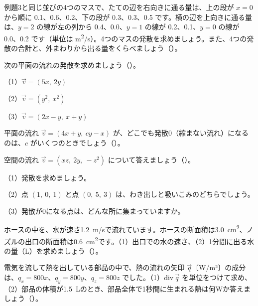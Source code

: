 \bkproblem 例題3と同じ並びの4つのマスで、たての辺を右向きに通る量は、上の段が $x=0$ から順に 0.1、0.6、0.2、下の段が 0.3、0.3、0.5 です。横の辺を上向きに通る量は、$y=2$ の線が左の列から 0.4、0.0、$y=1$ の線が 0.2、0.1、$y=0$ の線が 0.0、0.2 です（単位は \unit{m^2/s}）。4つのマスの発散を求めましょう。また、4つの発散の合計と、外まわりから出る量をくらべましょう\mbox{（）}。

\bkproblem 次の平面の流れの発散を求めましょう\mbox{（）}。\par
（1）$\vec v=(5x,\ 2y)$\par
（2）$\vec v=(y^2,\ x^2)$\par
（3）$\vec v=(2x-y,\ x+y)$

\bkproblem 平面の流れ $\vec v=(4x+y,\ cy-x)$ が、どこでも発散0（縮まない流れ）になるのは、$c$ がいくつのときでしょう\mbox{（）}。

\bkproblem 空間の流れ $\vec v=(xz,\ 2y,\ -z^2)$ について答えましょう\mbox{（）}。\par
（1）発散を求めましょう。\par
（2）点 $(1,\ 0,\ 1)$ と点 $(0,\ 5,\ 3)$ は、わき出しと吸いこみのどちらでしょう。\par
（3）発散が0になる点は、どんな所に集まっていますか。

\bkproblem ホースの中を、水が速さ\qty{1.2}{m/s}で流れています。ホースの断面積は\qty{3.0}{cm^2}、ノズルの出口の断面積は\qty{0.6}{cm^2}です。（1）出口での水の速さ、（2）1分間に出る水の量（L）を求めましょう\mbox{（）}。

\bkproblem 電気を流して熱を出している部品の中で、熱の流れの矢印 $\vec q$〔W/m²〕の成分は、$q_x=800x$、$q_y=800y$、$q_z=800z$ でした。（1）$\mathrm{div}\,\vec q$ を単位をつけて求め、（2）部品の体積が\qty{1.5}{L}のとき、部品全体で1秒間に生まれる熱は何Wか答えましょう\mbox{（）}。

